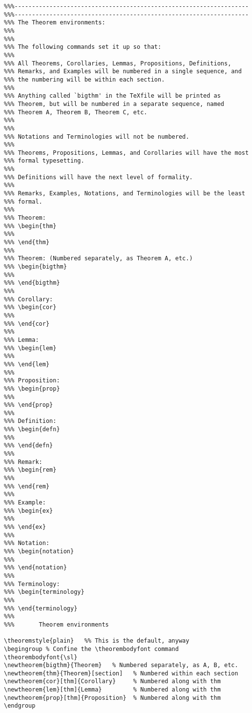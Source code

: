 \begin{verbatim}
%%%-------------------------------------------------------------------
%%%-------------------------------------------------------------------
%%% The Theorem environments:
%%%
%%%
%%% The following commands set it up so that:
%%%
%%% All Theorems, Corollaries, Lemmas, Propositions, Definitions,
%%% Remarks, and Examples will be numbered in a single sequence, and
%%% the numbering will be within each section.
%%%
%%% Anything called `bigthm' in the TeXfile will be printed as
%%% Theorem, but will be numbered in a separate sequence, named
%%% Theorem A, Theorem B, Theorem C, etc.
%%%
%%%
%%% Notations and Terminologies will not be numbered.
%%%
%%% Theorems, Propositions, Lemmas, and Corollaries will have the most
%%% formal typesetting.
%%%
%%% Definitions will have the next level of formality.
%%%
%%% Remarks, Examples, Notations, and Terminologies will be the least
%%% formal.
%%%
%%% Theorem:
%%% \begin{thm}
%%%
%%% \end{thm}
%%%
%%% Theorem: (Numbered separately, as Theorem A, etc.)
%%% \begin{bigthm}
%%%
%%% \end{bigthm}
%%%
%%% Corollary:
%%% \begin{cor}
%%%
%%% \end{cor}
%%%
%%% Lemma:
%%% \begin{lem}
%%%
%%% \end{lem}
%%%
%%% Proposition:
%%% \begin{prop}
%%%
%%% \end{prop}
%%%
%%% Definition:
%%% \begin{defn}
%%%
%%% \end{defn}
%%%
%%% Remark:
%%% \begin{rem}
%%%
%%% \end{rem}
%%%
%%% Example:
%%% \begin{ex}
%%%
%%% \end{ex}
%%%
%%% Notation:
%%% \begin{notation}
%%%
%%% \end{notation}
%%%
%%% Terminology:
%%% \begin{terminology}
%%%
%%% \end{terminology}
%%%
%%%       Theorem environments

\theoremstyle{plain}   %% This is the default, anyway
\begingroup % Confine the \theorembodyfont command
\theorembodyfont{\sl}
\newtheorem{bigthm}{Theorem}   % Numbered separately, as A, B, etc.
\newtheorem{thm}{Theorem}[section]   % Numbered within each section
\newtheorem{cor}[thm]{Corollary}     % Numbered along with thm
\newtheorem{lem}[thm]{Lemma}         % Numbered along with thm
\newtheorem{prop}[thm]{Proposition}  % Numbered along with thm
\endgroup


\end{verbatim}
